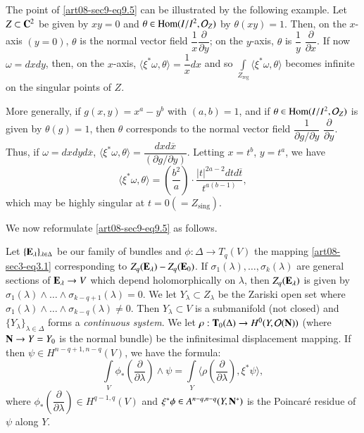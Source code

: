 \begin{example*}
The point of \eqref{art08-sec9-eq9.5} can be illustrated by the following example. Let $Z\subset \mathbf{C}^{2}$ be given by $xy=0$ and $\theta\in \operatorname{\mathrm{Hom}}(I/I^{2},\mathcal{O}_{Z})$ by $\theta(xy)=1$. Then, on the $x$-axis $(y=0)$, $\theta$ is the normal vector field $\dfrac{1}{x}\dfrac{\partial}{\partial y}$; on the $y$-axis, $\theta$ is $\dfrac{1}{y}$ $\dfrac{\partial}{\partial x}$. If now $\omega=dxdy$, then, on the $x$-axis, $\langle \xi^{*}\omega,\theta\rangle=\dfrac{1}{x}dx$ and so $\int\limits_{Z_{\text{reg}}}\langle \xi^{*}\omega,\theta\rangle$ becomes infinite on the singular points of $Z$.
\end{example*}

More generally, if $g(x,y)=x^{a}-y^{b}$ with $(a,b)=1$, and if $\theta\in \operatorname{\mathrm{Hom}}(I/I^{2},\mathcal{O}_{Z})$ is given by $\theta(g)=1$, then $\theta$ corresponds to the normal vector field $\dfrac{1}{\partial g/\partial y}$ $\dfrac{\partial}{\partial y}$. Thus, if $\omega = dxdyd\overline{x}$, $\langle \xi^{*}\omega,\theta\rangle=\dfrac{dxd\overline{x}}{(\partial g/\partial y)}$. Letting $x=t^{b}$, $y=t^{a}$, we have
$$
\langle \xi^{*}\omega,\theta\rangle =\left(\dfrac{b^{2}}{a}\right)\cdot \dfrac{|t|^{2a-2}dtd\overline{t}}{t^{a(b-1)}},
$$\pageoriginale
which may be highly singular at $t=0(=Z_{\text{sing}})$.

We now reformulate \eqref{art08-sec9-eq9.5} as follows.

Let $\{\mathbf{E}_{\lambda}\}_{\lambda\in \Delta}$ be our family of bundles and $\phi:\Delta\to T_{q}(V)$ the mapping \eqref{art08-sec3-eq3.1} corresponding to $Z_{q}(\mathbf{E}_{\lambda})-Z_{q}(\mathbf{E}_{0})$. If $\sigma_{1}(\lambda),\ldots,\sigma_{k}(\lambda)$ are general sections of $\mathbf{E}_{\lambda}\to V$ which depend holomorphically on $\lambda$, then $Z_{q}(\mathbf{E}_{\lambda})$ is given by $\sigma_{1}(\lambda)\wedge\ldots\wedge \sigma_{k-q+1}(\lambda)=0$. We let $Y_{\lambda}\subset Z_{\lambda}$ be the Zariski open set where $\sigma_{1}(\lambda)\wedge\ldots\wedge \sigma_{k-q}(\lambda)\neq 0$. Then $Y_{\lambda}\subset V$ is a submanifold (not closed) and $\{Y_{\lambda}\}_{\lambda\in \Delta}$ forms a {\em continuous system}. We let $\rho:\mathbf{T}_{0}(\Delta)\to H^{0}(Y,\mathcal{O}(\mathbf{N}))$ (where $\mathbf{N}\to Y=Y_{0}$ is the normal bundle) be the infinitesimal displacement mapping. If then $\psi\in H^{n-q+1,n-q}(V)$, we have the formula:
\setcounter{equation}{7}
\begin{equation}
\int\limits_{V}\phi_{*}\left(\dfrac{\partial}{\partial\lambda}\right)\wedge\psi=\int\limits_{Y}\langle \rho\left(\dfrac{\partial}{\partial\lambda}\right),\xi^{*}\psi\rangle,\label{art08-sec9-eq9.8}
\end{equation}
where $\phi_{*}\left(\dfrac{\partial}{\partial\lambda}\right)\in H^{q-1,q}(V)$ and $\xi^{*}\phi\in A^{n-q,n-q}(Y,\mathbf{N}^{*})$ is the Poincar\'e residue of $\psi$ along $Y$.

